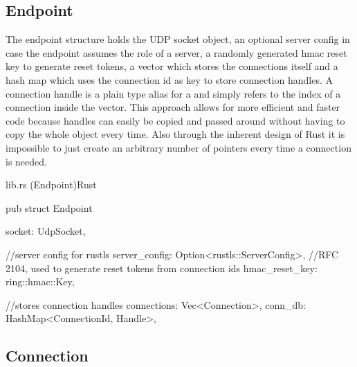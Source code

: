 \subsection{Endpoint}

The endpoint structure holds the UDP socket object, an optional server config in case the endpoint assumes the role of a server, a randomly generated
hmac reset key to generate reset tokens, a vector which stores the connections itself and a hash map which uses the connection id as key to store
connection handles. A connection handle is a plain type alias for a  and simply refers to the index of a connection inside the
vector. This approach allows for more efficient and faster code because handles can easily be copied and passed around without having to copy the
whole  object every time. Also through the inherent design of Rust it is impossible to just create an arbitrary number of
pointers every time a connection is needed. 

\begin{codeblock}{lib.rs (Endpoint)}{Rust}
  \begin{rustcode}
    pub struct Endpoint {
        socket: UdpSocket,

        //server config for rustls
        server_config: Option<rustls::ServerConfig>,
        //RFC 2104, used to generate reset tokens from connection ids
        hmac_reset_key: ring::hmac::Key,

        //stores connection handles
        connections: Vec<Connection>,
        conn_db: HashMap<ConnectionId, Handle>,
    }
  \end{rustcode}
\end{codeblock}

\subsection{Connection}

